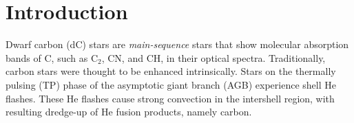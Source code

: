\documentclass[twocolumn, tighten, times, astrosymb]{aastex631}
\begin{document}






\section{Introduction}\label{sec:intro}

Dwarf carbon (dC) stars are \textit{main-sequence} stars that show molecular absorption bands of C, such as C$_2$, CN, and CH, in their optical spectra. Traditionally, carbon stars were thought to be enhanced intrinsically. Stars on the thermally pulsing (TP) phase of the asymptotic giant branch (AGB) experience shell He flashes. These He flashes cause strong convection in the intershell region, with resulting dredge-up \citep[the third dredge-up;][]{Iben1974} of He fusion products, namely carbon.
\end{document}
